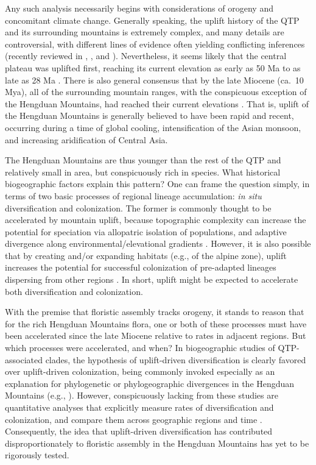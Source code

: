 Any such analysis necessarily begins with considerations of orogeny and concomitant climate change. Generally speaking, the uplift history of the QTP and its surrounding mountains is extremely complex, and many details are controversial, with different lines of evidence often yielding conflicting inferences (recently reviewed in \citet{Wang2014}, \citet{Favre2014}, and \citet{Deng2015}). Nevertheless, it seems likely that the central plateau was uplifted first, reaching its current elevation as early as 50 Ma to as late as 28 Ma \citep{Xu2013,Wang2014,Rowley2006}. There is also general consensus that by the late Miocene (ca.\ 10 Mya), all of the surrounding mountain ranges, with the conspicuous exception of the Hengduan Mountains, had reached their current elevations \citep{WangE2012,SunB2011}. That is, uplift of the Hengduan Mountains is generally believed to have been rapid and recent, occurring during a time of global cooling, intensification of the Asian monsoon, and increasing aridification of Central Asia. 

The Hengduan Mountains are thus younger than the rest of the QTP and relatively small in area, but conspicuously rich in species. What historical biogeographic factors explain this pattern? One can frame the question simply, in terms of two basic processes of regional lineage accumulation: \textit{in situ} diversification and colonization. The former is commonly thought to be accelerated by mountain uplift, because topographic complexity can increase the potential for speciation via allopatric isolation of populations, and adaptive divergence along environmental/elevational gradients \citep{Hughes2006,LiuJ2006,Xu2010}. However, it is also possible that by creating and/or expanding habitats (e.g., of the alpine zone), uplift increases the potential for successful colonization of pre-adapted lineages dispersing from other regions \citep{Zhou2013}. In short, uplift might be expected to accelerate both diversification and colonization.

With the premise that floristic assembly tracks orogeny, it stands to reason that for the rich Hengduan Mountains flora, one or both of these processes must have been accelerated since the late Miocene relative to rates in adjacent regions. But which processes were accelerated, and when? In biogeographic studies of QTP-associated clades, the hypothesis of uplift-driven diversification is clearly favored over uplift-driven colonization, being commonly invoked especially as an explanation for phylogenetic or phylogeographic divergences in the Hengduan Mountains (e.g., \citealt{LiuJ2006,WangY2009,ZhangJ2014}). However, conspicuously lacking from these studies are quantitative analyses that explicitly measure rates of diversification and colonization, and compare them across geographic regions and time \citep{Wen2014,Favre2014}. Consequently, the idea that uplift-driven diversification has contributed disproportionately to floristic assembly in the Hengduan Mountains has yet to be rigorously tested.


